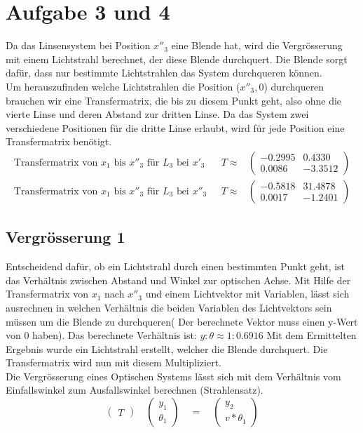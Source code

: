 \documentclass[11pt,twoside,a4paper]{article}
\begin{document}
	\section{Aufgabe 3 und 4}
	Da das Linsensystem bei Position \(x''_{3}\) eine Blende hat, wird die Vergrösserung mit einem Lichtstrahl berechnet, der diese Blende durchquert. Die Blende sorgt dafür, dass nur bestimmte Lichtstrahlen das System durchqueren können. \\
	Um herauszufinden welche Lichtstrahlen die Position (\(x''_{3},0\)) durchqueren brauchen wir eine Transfermatrix, die bis zu diesem Punkt geht, also ohne die vierte Linse und deren Abstand zur dritten Linse.
	Da das System zwei verschiedene Positionen für die dritte Linse erlaubt, wird für jede Position eine Transfermatrix benötigt. 
	\begin{equation*}
	\begin{aligned}
	\textrm{Transfermatrix von \(x_{1}\) bis \(x''_{3}\) für \(L_{3}\) bei \(x'_{3}\) } & T \approx
	&
	\begin{pmatrix}
	-0.2995 & 0.4330\\
	0.0086 & -3.3512
	\end{pmatrix}\\
	\textrm{Transfermatrix von \(x_{1}\) bis \(x''_{3}\) für \(L_{3}\) bei \(x''_{3}\) } & T \approx
	&
	\begin{pmatrix}
	-0.5818 & 31.4878\\
	0.0017 & -1.2401
	\end{pmatrix}
	\end{aligned}
	\end{equation*}
	\subsection{Vergrösserung 1}
	Entscheidend dafür, ob ein Lichtstrahl durch einen bestimmten Punkt geht, ist das Verhältnis zwischen Abstand und Winkel zur optischen Achse. Mit Hilfe der Transfermatrix von \(x_{1}\) nach \(x''_{3}\) und einem Lichtvektor mit Variablen, lässt sich ausrechnen in welchen Verhältnis die beiden Variablen des Lichtvektors sein müssen um die Blende zu durchqueren( Der berechnete Vektor muss einen y-Wert von 0 haben). Das berechnete Verhältnis ist: \(y:\theta \approx 1:0.6916\) Mit dem Ermittelten Ergebnis wurde ein Lichtstrahl erstellt, welcher die Blende durchquert. Die Transfermatrix wird nun mit diesem Multipliziert. \\
	Die Vergrösserung eines Optischen Systems lässt sich mit dem Verhältnis vom Einfallswinkel zum Ausfallswinkel berechnen (Strahlensatz). 
	\begin{equation} \label{vergr}
	\begin{pmatrix}
	T
	\end{pmatrix}
	\quad
	\begin{pmatrix}
	y_{1}\\
	\theta_{1}
	\end{pmatrix}
	\quad
	=
	\quad
	\begin{pmatrix}
	y_{2}\\
	v * \theta_{1}
	\end{pmatrix}
	\end{equation}
	
\end{document}
